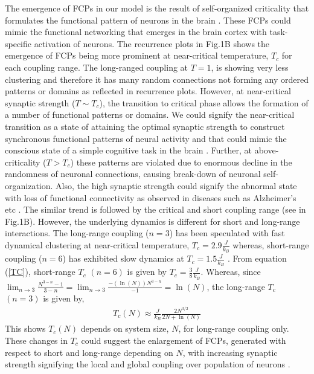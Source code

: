 \documentclass[preprintnumbers,amsmath,amssymb,onecolumn]{revtex4}
\begin{document}
{\noindent}The emergence of FCPs in our model is the result of self-organized criticality that formulates the functional pattern of neurons in the brain \citep{Kitzbichler2009}. These FCPs could mimic the functional networking that emerges in the brain cortex with task-specific activation of neurons. The recurrence plots in Fig.1B shows the emergence of FCPs being more prominent at near-critical temperature, $T_{c}$ for each coupling range. The long-ranged coupling at $T = 1$, is showing very less clustering and therefore it has many random connections not forming any ordered patterns or domains as reflected in recurrence plots. However, at near-critical synaptic strength ($T \sim T_{c}$), the transition to critical phase allows the formation of a number of functional patterns or domains. We could signify the near-critical transition as a state of attaining the optimal synaptic strength to construct synchronous functional patterns of neural activity and that could mimic the conscious state of a simple cognitive task in the brain \citep{Eguiluz2005a}. Further, at above-criticality ($T > T_{c}$) these patterns are violated due to enormous decline in the randomness of neuronal connections, causing break-down of neuronal self-organization. Also, the high synaptic strength could signify the abnormal state with loss of functional connectivity as observed in diseases such as Alzheimer's etc \citep{Stam2007}. The similar trend is followed by the critical and short coupling range (see in Fig.1B). However, the underlying dynamics is different for short and long-range interactions. The long-range coupling ($n=3$) has been speculated with fast dynamical clustering at near-critical temperature, {$T_{c}= 2.9\frac{J}{k_B}$} whereas, short-range coupling ($n=6$) has exhibited slow dynamics at {$T_{c} = 1.5\frac{J}{k_B}$} \citep{Gundh2015}. From equation (\ref{TC}), short-range $T_c$ $(n=6)$ is given by $T_c=\frac{3}{8}\frac{J}{k_B}$. Whereas, since $\lim_{n\rightarrow 3}\frac{N^{3-n}-1}{3-n}=\lim_{n\rightarrow 3}\frac{-(\ln(N))N^{3-n}}{-1}=\ln(N)$, the long-range $T_c$ $(n=3)$ is given by, 
\begin{eqnarray}
T_c(N)\approx\frac{J}{k_B}\frac{2N^{3/2}}{2N+\ln(N)}
\end{eqnarray}
This shows $T_c(N)$ depends on system size, $N$, {for long-range coupling} only. These changes in $T_c$ could suggest the enlargement of FCPs, generated with respect to short and long-range depending on $N$, with increasing synaptic strength signifying the local and global coupling over population of neurons \citep{Kitzbichler2009, Deco2012}. \\
\end{document}
